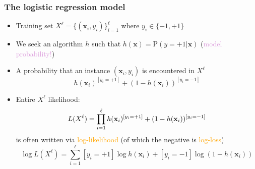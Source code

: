 \documentclass[usenames,dvipsnames,aspectratio=169]{beamer}
\begin{document}
\begin{frame}
\frametitle{The logistic regression model}

\begin{itemize}

  \item Training set $X^{\ell} = 
    \big\{(\mathbf{x}_i, y_i)\big\}_{i=1}^{\ell}$
    where $y_i \in \{-1, +1\}$

  \pause
  \item We seek an algorithm $h$ such that
  $h(\mathbf{x}) = \mathrm{P}(y = +1 | \mathbf{x})$
  (\textcolor{Plum}{model probability!})

  \pause
  \item A probability that an instance $(\mathbf{x}_i, y_i)$
  is encountered in $X^{\ell}$
  \[
  h(\mathbf{x}_i)^{[y_i = +1]} + (1 - h(\mathbf{x}_i))^{[y_i = -1]}
  \]

  \pause
  \item Entire $X^{\ell}$ likelihood:
  \vspace{-2mm}
  \[
  L(X^{\ell}) = \prod\limits_{i=1}^{\ell}
    h(\mathbf{x}_i)^{[y_i = +1]} + (1 - h(\mathbf{x}_i))^{[y_i = -1]}
  \vspace{-2mm}
  \]
  \pause
  is often written via \textcolor{orange}{log-likelihood}
  (of which the negative is \textcolor{orange}{log-loss})
  \vspace{-2mm}
  \[
  \log L(X^{\ell}) = \sum\limits_{i=1}^{\ell}
    [y_i = +1] \log h(\mathbf{x}_i) + 
    [y_i = -1] \log (1 - h(\mathbf{x}_i))
  \]

\end{itemize}

\end{frame}
\end{document}
